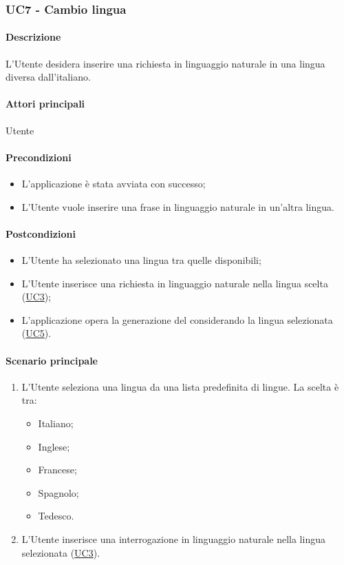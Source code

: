 \subsubsection{UC7 - Cambio lingua}\label{UC7}
\paragraph*{Descrizione}
L’Utente desidera inserire una richiesta in linguaggio naturale in una lingua diversa dall’italiano.

\paragraph*{Attori principali}
Utente

\paragraph*{Precondizioni}
\begin{itemize}
  \item L'applicazione è stata avviata con successo;
  \item L’Utente vuole inserire una frase in linguaggio naturale in un'altra lingua.
\end{itemize}

\paragraph*{Postcondizioni}
\begin{itemize}
  \item L'Utente ha selezionato una lingua tra quelle disponibili;
  \item L'Utente inserisce una richiesta in linguaggio naturale nella lingua scelta (\hyperref[UC3]{UC3});
  \item L'applicazione opera la generazione del  considerando la lingua selezionata (\hyperref[UC5]{UC5}).
\end{itemize}

\paragraph*{Scenario principale}
\begin{enumerate}
  \item L’Utente seleziona una lingua da una lista predefinita di lingue. La scelta è tra:
    \begin{itemize}
      \item Italiano;
      \item Inglese;
      \item Francese;
      \item Spagnolo;
      \item Tedesco.
    \end{itemize}
  \item L’Utente inserisce una interrogazione in linguaggio naturale nella lingua selezionata (\hyperref[UC3]{UC3}).  
\end{enumerate}

